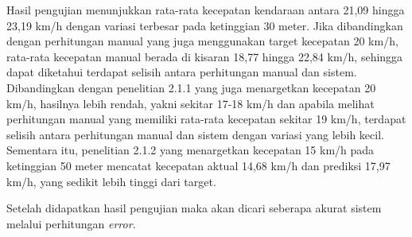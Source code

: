 Hasil pengujian menunjukkan rata-rata kecepatan kendaraan antara 21,09 hingga 23,19 km/h dengan variasi terbesar pada ketinggian 30 meter. Jika dibandingkan dengan perhitungan manual yang juga menggunakan target kecepatan 20 km/h, rata-rata kecepatan manual berada di kisaran 18,77 hingga 22,84 km/h, sehingga dapat diketahui terdapat selisih antara perhitungan manual dan sistem. Dibandingkan dengan penelitian 2.1.1 yang juga menargetkan kecepatan 20 km/h, hasilnya lebih rendah, yakni sekitar 17-18 km/h dan apabila melihat perhitungan manual yang memiliki rata-rata kecepatan sekitar 19 km/h, terdapat selisih antara perhitungan manual dan sistem dengan variasi yang lebih kecil. Sementara itu, penelitian 2.1.2 yang menargetkan kecepatan 15 km/h pada ketinggian 50 meter mencatat kecepatan aktual 14,68 km/h dan prediksi 17,97 km/h, yang sedikit lebih tinggi dari target.

Setelah didapatkan hasil pengujian maka akan dicari seberapa akurat sistem melalui perhitungan \emph{error}.

